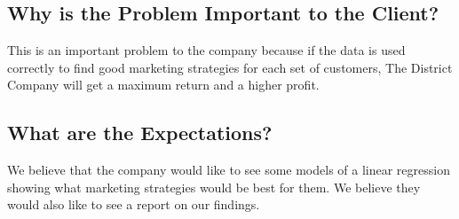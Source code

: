 \documentclass[11pt]{report}
\begin{document}
\subsection*{\hspace{-.5cm} Why is the Problem Important to the
Client?}\label{tech} This is an important problem to the company because if the data is used
correctly to find good marketing strategies for each set of customers, The
District Company will get a maximum return and a higher profit.

\subsection*{\hspace{-.5cm} What are the Expectations?}\label{tech}
We believe that the company would like to see some models of a linear regression
showing what marketing strategies would be best for them.  We believe they would
also like to see a report on our findings.
\end{document}
